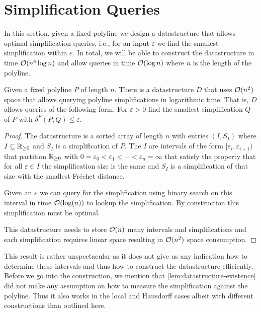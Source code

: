 \section{Simplification Queries}
\label{sec:simplification-queries}

In this section, given a fixed polyline we design a datastructure that allows optimal simplification queries, i.e., for 
an input \(\varepsilon\) we find the smallest simplification within \(\varepsilon\). In total, we will be able to construct the datastructure in time \(\mathcal{O}(n^4\log n)\) and allow queries in time \(\mathcal{O}(\log n)\) where \(n\) is the length of the polyline.

\begin{lemma}\label{lem:datastructure-existence}
  Given a fixed polyline \(P\) of length \(n\). There is a datastructure \(D\) that uses \(\mathcal{O}(n^2)\) space that allows querying polyline simplifications in logarithmic time. That is, \(D\) allows queries of the following form: For \(\varepsilon > 0\) find the smallest simplification \(Q\) of \(P\) with \(\delta^F(P, Q) \leq \varepsilon\).
\end{lemma}

\begin{proof}
  The datastructure is a sorted array of length \(n\) with entries \((I, S_I)\) where \(I \subseteq \mathbb{R}_{\geq 0}\) and \(S_I\) is a simplification of \(P\). The \(I\) are intervals of the form \([\varepsilon_i, \varepsilon_{i+1})\) that partition \(\mathbb{R}_{\geq 0}\) with \(0 = \varepsilon_0 < \varepsilon_1 < \cdots < \varepsilon_{n} = \infty\) that satisfy the property that for all \(\varepsilon \in I\) the simplification size is the same and \(S_I\) is a simplification of that size with the smallest Fréchet distance. 

	Given an \(\varepsilon\) we can query for the simplification using binary search on this interval in time \(\mathcal{O}(\log(n))\) to lookup the simplification. By construction this simplification must be optimal.

	This datastructure needs to store \(\mathcal{O}(n)\) many intervals and simplifications and each simplification requires linear space resulting in \(\mathcal{O}(n^2)\) space consumption.
\end{proof}

This result is rather unspectacular as it does not give us any indication how to determine these intervals and thus how to construct the datastructure efficiently. Before we go into the construction, we mention that \cref{lem:datastructure-existence} did not make any assumption on how to measure the simplification against the polyline. Thus it also works in the local and Hausdorff cases albeit with different constructions than outlined here. 

